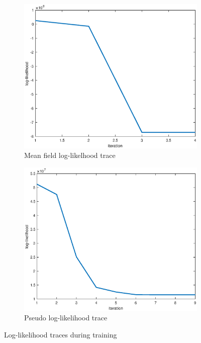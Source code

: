 \documentclass{article}
\begin{document}
\begin{figure}[H]
\begin{subfigure}{0.45\textwidth}
\includegraphics[width=\linewidth]{paper_images/mf_ll_trace.eps}
\caption{Mean field log-likelhood trace}
\label{fig:mf_lltrace}
\end{subfigure}
\begin{subfigure}{0.45\textwidth}
\includegraphics[width=\linewidth]{paper_images/pll_ll_trace.eps}
\caption{Pseudo log-likelihood trace}
\label{fig:pll_lltrace}
\end{subfigure}
\caption{Log-likelihood traces during training}
\label{fig:lltrace}
\end{figure}
\end{document}
